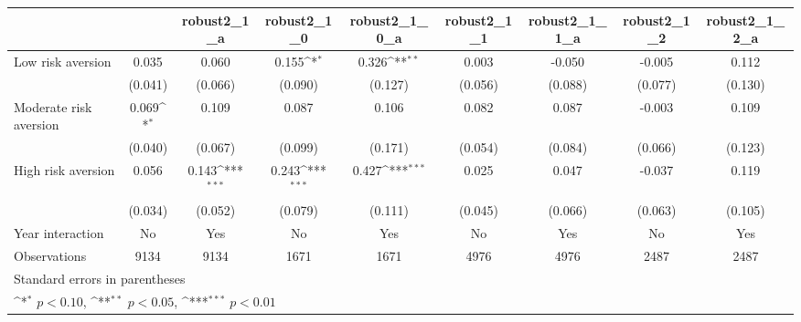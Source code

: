 {
\def\sym#1{\ifmmode^{#1}\else\(^{#1}\)\fi}
\begin{tabular}{l*{8}{c}}
\toprule
                &\multicolumn{1}{c}{}&\multicolumn{1}{c}{robust2\_1\_a}&\multicolumn{1}{c}{robust2\_1\_0}&\multicolumn{1}{c}{robust2\_1\_0\_a}&\multicolumn{1}{c}{robust2\_1\_1}&\multicolumn{1}{c}{robust2\_1\_1\_a}&\multicolumn{1}{c}{robust2\_1\_2}&\multicolumn{1}{c}{robust2\_1\_2\_a}\\
\midrule
Low risk aversion&    0.035         &    0.060         &    0.155\sym{*}  &    0.326\sym{**} &    0.003         &   -0.050         &   -0.005         &    0.112         \\
                &  (0.041)         &  (0.066)         &  (0.090)         &  (0.127)         &  (0.056)         &  (0.088)         &  (0.077)         &  (0.130)         \\
\addlinespace
Moderate risk aversion&    0.069\sym{*}  &    0.109         &    0.087         &    0.106         &    0.082         &    0.087         &   -0.003         &    0.109         \\
                &  (0.040)         &  (0.067)         &  (0.099)         &  (0.171)         &  (0.054)         &  (0.084)         &  (0.066)         &  (0.123)         \\
\addlinespace
High risk aversion&    0.056         &    0.143\sym{***}&    0.243\sym{***}&    0.427\sym{***}&    0.025         &    0.047         &   -0.037         &    0.119         \\
                &  (0.034)         &  (0.052)         &  (0.079)         &  (0.111)         &  (0.045)         &  (0.066)         &  (0.063)         &  (0.105)         \\
\addlinespace
Year interaction &       No         &      Yes         &       No         &      Yes         &       No         &      Yes         &       No         &      Yes         \\
\midrule
Observations    &     9134         &     9134         &     1671         &     1671         &     4976         &     4976         &     2487         &     2487         \\
\bottomrule
\multicolumn{9}{l}{\footnotesize Standard errors in parentheses}\\
\multicolumn{9}{l}{\footnotesize \sym{*} \(p<0.10\), \sym{**} \(p<0.05\), \sym{***} \(p<0.01\)}\\
\end{tabular}
}
